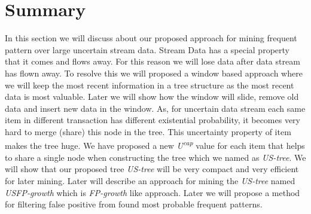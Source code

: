 	\section{Summary}
	In this section we will discuss about our proposed approach for mining frequent pattern over large uncertain stream data. Stream Data has a special property that it comes and flows away. For this reason we will lose data after data stream has flown away. To resolve this we will proposed a window based approach where we will keep the most recent information in a tree structure as the most recent data is most valuable. Later we will show how the window will slide, remove old data and insert new data in the window. As, for uncertain data stream each same item in different transaction has different existential probability, it becomes very hard to merge (share) this node in the tree. This uncertainty property of item makes the tree huge. We have proposed a new \emph{U\textsuperscript{cap}} value for each item that helps to share a single node when constructing the tree which we named as \emph{US-tree}. We will show that our proposed tree \emph{US-tree} will be very compact and very efficient for later mining. Later will describe an approach for mining the \emph {US-tree} named \emph{USFP-growth} which is \emph{FP-growth} like approach. Later we will propose a method for filtering false positive from found most probable frequent patterns.
%